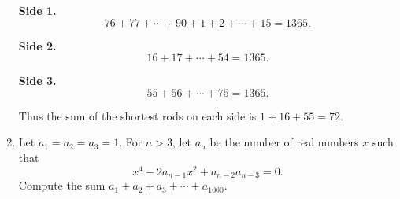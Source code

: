 \documentclass[9pt]{article}
\begin{document}
\begin{enumerate}
      \textbf{Side 1.}
      $$76 + 77 + \cdots + 90 + 1 + 2 + \cdots + 15 = 1365.$$
      
      \textbf{Side 2.}
      $$16 + 17 + \cdots + 54 = 1365.$$
      
      \textbf{Side 3.}
      $$55 + 56 + \cdots + 75 = 1365.$$
      
      Thus the sum of the shortest rods on each side is $1 + 16 + 55 = 72$.
   \item Let $a_1 = a_2 = a_3 = 1$. For $n > 3$, let $a_n$ be the number of
         real numbers $x$ such that
         $$x^4 - 2a_{n-1}x^2+a_{n-2}a_{n-3} = 0.$$
         Compute the sum $a_1 + a_2 + a_3 + \cdots + a_{1000}$.
\end{enumerate}
\end{document}
